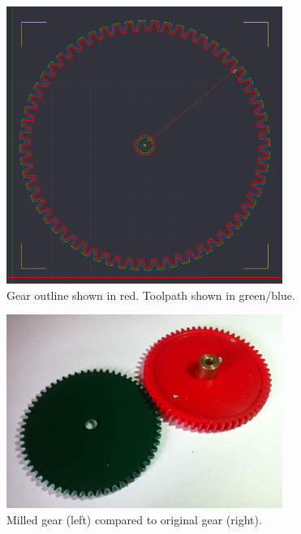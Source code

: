 \begin{figure}[ht!]
\centering
\includegraphics[width=90mm]{resources/gear_cambam.png}
\caption{Gear outline shown in red. Toolpath shown in green/blue.}
\label{overflow}
\end{figure}

\begin{figure}[ht!]
\centering
\includegraphics[width=90mm]{resources/gear_comparison.jpg}
\caption{Milled gear (left) compared to original gear (right).}
\label{fig:gearcomparison}
\end{figure}


